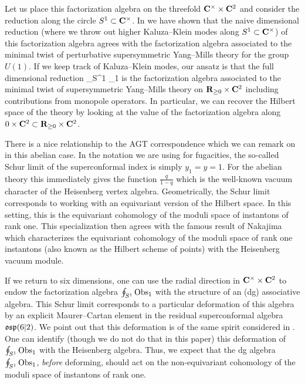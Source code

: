 Let us place this factorization algebra on the threefold $\mathbf{C}^\times \times \mathbf{C}^2$ and consider the reduction along the circle $S^1 \subset \mathbf{C}^\times$. 
In \cite{SWtensor} we have shown that the naive dimensional reduction (where we throw out higher Kaluza--Klein modes along $S^1 \subset \mathbf{C}^\times$) of this factorization algebra agrees with the factorization algebra associated to the minimal twist of perturbative supersymmetric Yang--Mills theory for the group $U(1)$. 
If we keep track of Kaluza--Klein modes, our ansatz is that the full dimensional reduction 
\beqn
\oint_{S^1} \Obs_1
\eeqn
is the factorization algebra associated to the minimal twist of supersymmetric Yang--Mills theory on $\mathbf{R}_{\geq 0} \times \mathbf{C}^2$ including contributions from monopole operators.
In particular, we can recover the Hilbert space of the theory by looking at the value of the factorization algebra along $0 \times \mathbf{C}^2 \subset \mathbf{R}_{\geq 0} \times \mathbf{C}^2$.

There is a nice relationship to the AGT correspondence which we can remark on in this abelian case. 
In the notation we are using for fugacities, the so-called Schur limit of the superconformal index is simply $y_1=y=1$.
For the abelian theory this immediately gives the function $\frac{q}{1-q}$ which is the well-known vacuum character of the Heisenberg vertex algebra. 
Geometrically, the Schur limit corresponds to working with an equivariant version of the Hilbert space.
In this setting, this is the equivariant cohomology of the moduli space of instantons of rank one.
This specialization then agrees with the famous result of Nakajima which characterizes the equivariant cohomology of the moduli space of rank one instantons (also known as the Hilbert scheme of points) with the Heisenberg vacuum module.

If we return to six dimensions, one can use the radial direction in $\mathbf{C}^\times \times \mathbf{C}^2$ to endow the factorization algebra $\oint_{S^1} \operatorname{Obs}_1$ with the structure of an (dg) associative algebra. 
This Schur limit corresponds to a particular deformation of this algebra by an explicit Maurer--Cartan element in the residual superconformal algebra $\mathfrak{osp}(6|2)$.
We point out that this deformation is of the same spirit considered in \cite{BeemEtAl}.
One can identify (though we do not do that in this paper) this deformation of $\oint_{S^1} \operatorname{Obs}_1$ with the Heisenberg algebra. 
Thus, we expect that the dg algebra $\oint_{S^1} \operatorname{Obs}_1$, {\em before} deforming, should act on the non-equivariant cohomology of the moduli space of instantons of rank one.

